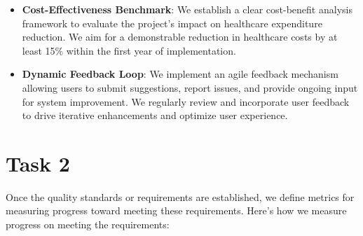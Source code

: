 \begin{itemize}
    \item \textbf{Cost-Effectiveness Benchmark}: We establish a clear cost-benefit analysis framework to evaluate the project's impact on healthcare expenditure reduction. We aim for a demonstrable reduction in healthcare costs by at least 15\% within the first year of implementation.
    \item \textbf{Dynamic Feedback Loop}: We implement an agile feedback mechanism allowing users to submit suggestions, report issues, and provide ongoing input for system improvement. We regularly review and incorporate user feedback to drive iterative enhancements and optimize user experience.
\end{itemize}

\section{Task 2}

Once the quality standards or requirements are established, we define metrics for measuring progress toward meeting these requirements. Here's how we measure progress on meeting the requirements:

